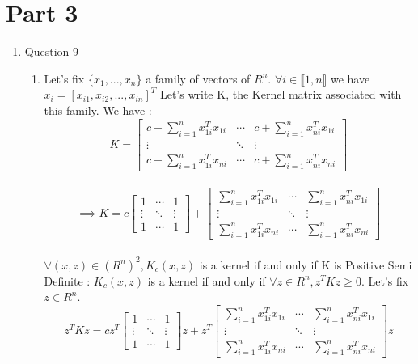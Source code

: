 \documentclass[final,3p,times,12pt]{article}
\begin{document}
\section{Part 3}
\begin{enumerate}
    \item Question 9
        \begin{enumerate}
        \item Let's fix $\{x_1, ..., x_n\}$ a family of vectors of $R^n$. $\forall i \in \llbracket 1,n \rrbracket$ we have $x_i = [x_{i1}, x_{i2},..., x_{in}]^T $ Let's write K, the Kernel matrix associated with this family. We have : 
\\
\[
K = \begin{bmatrix}
  c + \sum_{i=1}^n x_{1i}^T x_{1i} & \cdots & c + \sum_{i=1}^n x_{ni}^T x_{1i} \\
  \vdots & \ddots & \vdots \\
  c + \sum_{i=1}^n x_{1i}^T x_{ni} & \cdots & c + \sum_{i=1}^n x_{ni}^T x_{ni}
\end{bmatrix}
\]
\\
\[
\implies K = c \begin{bmatrix}
  1 & \cdots & 1 \\
  \vdots & \ddots & \vdots \\
  1 & \cdots & 1
\end{bmatrix} + \begin{bmatrix}
  \sum_{i=1}^n x_{1i}^T x_{1i} & \cdots & \sum_{i=1}^n x_{ni}^T x_{1i} \\
  \vdots & \ddots & \vdots \\
  \sum_{i=1}^n x_{1i}^T x_{ni} & \cdots & \sum_{i=1}^n x_{ni}^T x_{ni}
\end{bmatrix}
\]\\

$\forall (x,z) \in (R^n)^2 , K_c(x, z)$ is a kernel if and only if K is Positive Semi Definite : $K_c(x, z)$ is a  kernel if and only if $\forall z \in R^n, z^TKz \geq 0$. Let's fix $ z \in R^n$. \\

\[
 z^TKz = c z^T\begin{bmatrix}
  1 & \cdots & 1 \\
  \vdots & \ddots & \vdots \\
  1 & \cdots & 1
\end{bmatrix}z + z^T\begin{bmatrix}
  \sum_{i=1}^n x_{1i}^T x_{1i} & \cdots & \sum_{i=1}^n x_{ni}^T x_{1i} \\
  \vdots & \ddots & \vdots \\
  \sum_{i=1}^n x_{1i}^T x_{ni} & \cdots & \sum_{i=1}^n x_{ni}^T x_{ni}
\end{bmatrix}z
\]\\


\end{enumerate}
\end{enumerate}
\end{document}
